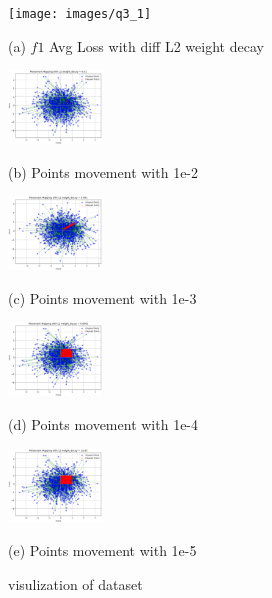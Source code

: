 \documentclass{article}
\begin{document}
\begin{figure}[htb]

  \begin{minipage}[b]{1.0\linewidth}
    \centering
    \centerline{\texttt{[image: images/q3\_1]}}
   \centerline{(a) $f1$ Avg Loss with diff L2 weight decay }\medskip
  \end{minipage}
  \begin{minipage}[b]{.48\linewidth}
    \centering
    \centerline{\includegraphics[width=2.5cm]{images/q3_1e-2}}
    \centerline{(b) Points movement with 1e-2}\medskip
  \end{minipage}
  \hfill
  \begin{minipage}[b]{0.48\linewidth}
    \centering
    \centerline{\includegraphics[width=2.5cm]{images/q3_1e-3}}
    \centerline{(c) Points movement with 1e-3}\medskip
  \end{minipage}
  \begin{minipage}[b]{.48\linewidth}
    \centering
    \centerline{\includegraphics[width=2.5cm]{images/q3_1e-4}}
    \centerline{(d) Points movement with 1e-4}\medskip
  \end{minipage}
  \hfill
  \begin{minipage}[b]{0.48\linewidth}
    \centering
    \centerline{\includegraphics[width=2.5cm]{images/q3_1e-5}}
    \centerline{(e) Points movement with 1e-5}\medskip
  \end{minipage}
  \caption{visulization of dataset}
  \label{fig:q3}
  \end{figure}
\end{document}
